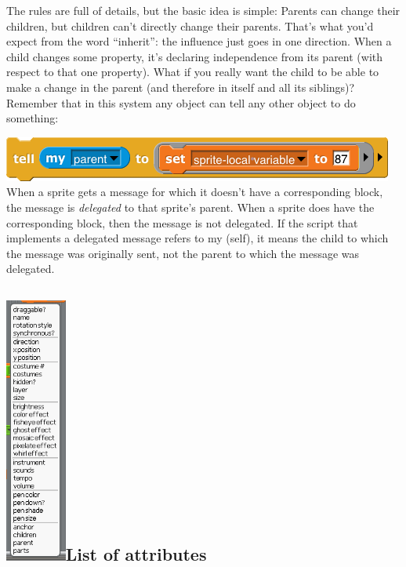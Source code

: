The rules are full of details, but the basic idea is simple: Parents can
change their children, but children can't directly change their parents.
That's what you'd expect from the word ``inherit'': the influence just
goes in one direction. When a child changes some property, it's
declaring independence from its parent (with respect to that one
property). What if you really want the child to be able to make a change
in the parent (and therefore in itself and all its siblings)? Remember
that in this system any object can tell any other object to do
something:

\includegraphics[width=5.07292in,height=0.58333in]{media/image779.png}When
a sprite gets a message for which it doesn't have a corresponding block,
the message is \emph{delegated} to that sprite's parent. When a sprite
does have the corresponding block, then the message is not delegated. If
the script that implements a delegated message refers to my (self), it
means the child to which the message was originally sent, not the parent
to which the message was delegated.

\subsection[List of
attributes]{\texorpdfstring{\protect\includegraphics[width=0.78958in,height=3.46806in]{media/image780.png}List
of
attributes}{attrib.pngList of attributes}}\label{attrib.pnglist-of-attributes}

